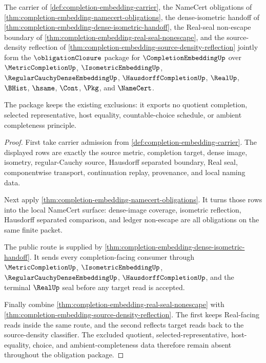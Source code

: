 \begin{theorem}
\label{thm:completion-embedding-obligation-closure-package}
The carrier of \autoref{def:completion-embedding-carrier}, the NameCert obligations of \autoref{thm:completion-embedding-namecert-obligations}, the dense-isometric handoff of \autoref{thm:completion-embedding-dense-isometric-handoff}, the Real-seal non-escape boundary of \autoref{thm:completion-embedding-real-seal-nonescape}, and the source-density reflection of \autoref{thm:completion-embedding-source-density-reflection} jointly form the $\obligationClosure$ package for $\CompletionEmbeddingUp$ over $\MetricCompletionUp$, $\IsometricEmbeddingUp$, $\RegularCauchyDenseEmbeddingUp$, $\HausdorffCompletionUp$, $\RealUp$, $\BHist$, $\hsame$, $\Cont$, $\Pkg$, and $\NameCert$.

The package keeps the existing exclusions: it exports no quotient completion, selected representative, host equality, countable-choice schedule, or ambient completeness principle.
\end{theorem}
\begin{proof}
First take carrier admission from \autoref{def:completion-embedding-carrier}. The displayed rows are exactly the source metric, completion target, dense image, isometry, regular-Cauchy source, Hausdorff separated boundary, Real seal, componentwise transport, continuation replay, provenance, and local naming data.

Next apply \autoref{thm:completion-embedding-namecert-obligations}. It turns those rows into the local NameCert surface: dense-image coverage, isometric reflection, Hausdorff separated comparison, and ledger non-escape are all obligations on the same finite packet.

The public route is supplied by \autoref{thm:completion-embedding-dense-isometric-handoff}. It sends every completion-facing consumer through $\MetricCompletionUp$, $\IsometricEmbeddingUp$, $\RegularCauchyDenseEmbeddingUp$, $\HausdorffCompletionUp$, and the terminal $\RealUp$ seal before any target read is accepted.

Finally combine \autoref{thm:completion-embedding-real-seal-nonescape} with \autoref{thm:completion-embedding-source-density-reflection}. The first keeps Real-facing reads inside the same route, and the second reflects target reads back to the source-density classifier. The excluded quotient, selected-representative, host-equality, choice, and ambient-completeness data therefore remain absent throughout the obligation package.
\end{proof}

